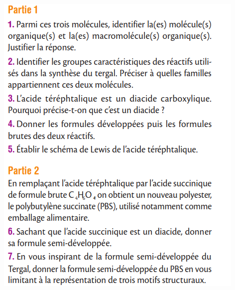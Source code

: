 \documentclass[10pt]{article}
\begin{document}
\begin{center}
\begin{minipage}[c]{0.45\textwidth}
		\includegraphics[scale=0.6]{assets/bacpart2.png}
	\end{minipage}






\end{center}
\end{document}
